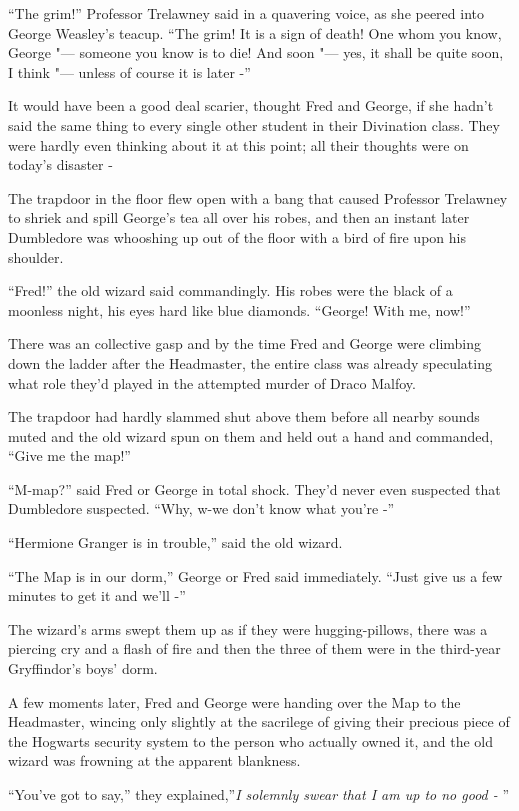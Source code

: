 ``The grim!'' Professor Trelawney said in a quavering voice, as she
peered into George Weasley's teacup. ``The grim! It is a sign of death!
One whom you know, George "--- someone you know is to die! And soon "--- yes,
it shall be quite soon, I think "--- unless of course it is later -''

It would have been a good deal scarier, thought Fred and George, if she
hadn't said the same thing to every single other student in their
Divination class. They were hardly even thinking about it at this point;
all their thoughts were on today's disaster -

The trapdoor in the floor flew open with a bang that caused Professor
Trelawney to shriek and spill George's tea all over his robes, and then
an instant later Dumbledore was whooshing up out of the floor with a
bird of fire upon his shoulder.

``Fred!'' the old wizard said commandingly. His robes were the black of
a moonless night, his eyes hard like blue diamonds. ``George! With me,
now!''

There was an collective gasp and by the time Fred and George were
climbing down the ladder after the Headmaster, the entire class was
already speculating what role they'd played in the attempted murder of
Draco Malfoy.

The trapdoor had hardly slammed shut above them before all nearby sounds
muted and the old wizard spun on them and held out a hand and commanded,
``Give me the map!''

``M-map?'' said Fred or George in total shock. They'd never even
suspected that Dumbledore suspected. ``Why, w-we don't know what you're
-''

``Hermione Granger is in trouble,'' said the old wizard.

``The Map is in our dorm,'' George or Fred said immediately. ``Just give
us a few minutes to get it and we'll -''

The wizard's arms swept them up as if they were hugging-pillows, there
was a piercing cry and a flash of fire and then the three of them were
in the third-year Gryffindor's boys' dorm.

A few moments later, Fred and George were handing over the Map to the
Headmaster, wincing only slightly at the sacrilege of giving their
precious piece of the Hogwarts security system to the person who
actually owned it, and the old wizard was frowning at the apparent
blankness.

``You've got to say,'' they explained,''\emph{I solemnly swear that I am
up to no good -} ''

